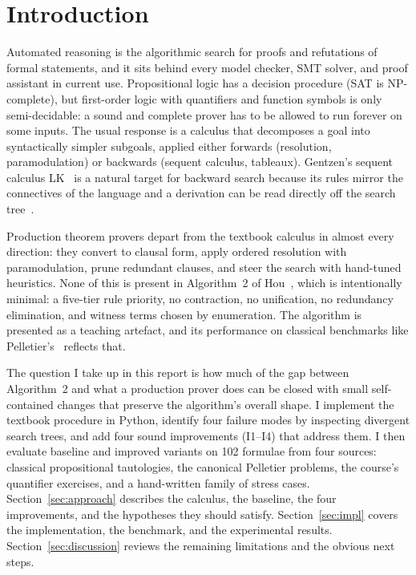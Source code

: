 \documentclass[runningheads]{llncs}
\begin{document}
\section{Introduction}
\label{sec:intro}


Automated reasoning is the algorithmic search for proofs and refutations
of formal statements, and it sits behind every model checker,
SMT solver, and proof assistant in current use. Propositional logic has
a decision procedure (SAT is NP-complete), but first-order logic with
quantifiers and function symbols is only semi-decidable: a sound and
complete prover has to be allowed to run forever on some inputs. The
usual response is a calculus that decomposes a goal into syntactically
simpler subgoals, applied either forwards (resolution, paramodulation)
or backwards (sequent calculus, tableaux). Gentzen's sequent calculus
LK~\cite{Gentzen1935} is a natural target for backward search because
its rules mirror the connectives of the language and a derivation can be
read directly off the search tree~\cite{Hou2021,TroelstraSchwichtenberg2000}.

Production theorem provers depart from the textbook calculus in almost
every direction: they convert to clausal form, apply ordered resolution
with paramodulation, prune redundant clauses, and steer the search with
hand-tuned heuristics. None of this is present in Algorithm~2 of
Hou~\cite[p.~67]{Hou2021}, which is intentionally minimal: a five-tier
rule priority, no contraction, no unification, no redundancy
elimination, and witness terms chosen by enumeration. The algorithm is
presented as a teaching artefact, and its performance on classical
benchmarks like Pelletier's~\cite{Pelletier1986} reflects that.

The question I take up in this report is how much of the gap between
Algorithm~2 and what a production prover does can be closed with small
self-contained changes that preserve the algorithm's overall shape.
I implement the textbook procedure in Python, identify four failure
modes by inspecting divergent search trees, and add four sound
improvements (I1--I4) that address them. I then evaluate baseline and
improved variants on 102 formulae from four sources: classical
propositional tautologies, the canonical Pelletier problems, the
course's quantifier exercises, and a hand-written family of stress
cases. Section~\ref{sec:approach} describes the calculus, the
baseline, the four improvements, and the hypotheses they should
satisfy. Section~\ref{sec:impl} covers the implementation, the
benchmark, and the experimental results. Section~\ref{sec:discussion}
reviews the remaining limitations and the obvious next steps.
\end{document}
